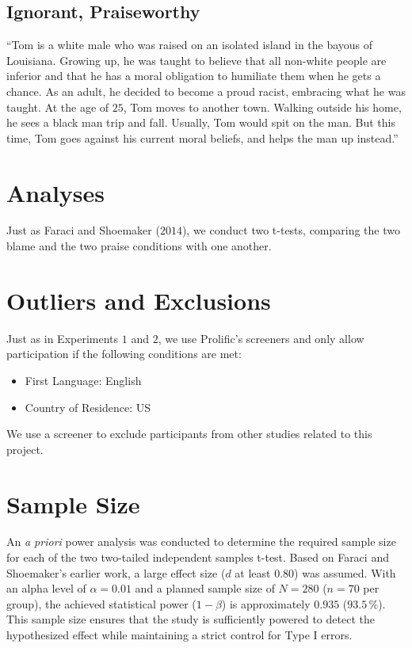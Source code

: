 \documentclass[scrarticle]{scrartcl}
\begin{document}
\subsection*{Ignorant, Praiseworthy}
\enquote{Tom is a white male who was raised on an isolated island in the bayous of Louisiana.
Growing up, he was taught to believe that all non-white people are inferior and that he has a moral obligation to humiliate them when he gets a chance.
As an adult, he decided to become a proud racist, embracing what he was taught.
At the age of $25$, Tom moves to another town.
Walking outside his home, he sees a black man trip and fall.
Usually, Tom would spit on the man.
But this time, Tom goes against his current moral beliefs, and helps the man up instead.}


\section{Analyses}
Just as Faraci and Shoemaker ($2014$), we conduct two t-tests, comparing the two blame and the two praise conditions with one another.


\section{Outliers and Exclusions}
Just as in Experiments $1$ and $2$, we use Prolific's screeners and only allow participation if the following conditions are met:

\begin{itemize}[noitemsep]
   \item[--] First Language: English
   \item[--] Country of Residence: US
\end{itemize}

\noindent We use a screener to exclude participants from other studies related to this project.


\section{Sample Size}
An \textit{a priori} power analysis was conducted to determine the required sample size for each of the two two-tailed independent samples t-test.
Based on Faraci and Shoemaker's earlier work, a large effect size ($d$ at least $0.80$) was assumed.
With an alpha level of $\alpha = 0.01$ and a planned sample size of $N = 280$ ($n = 70$ per group), the achieved statistical power ($1 - \beta$) is approximately $0.935$ ($93.5\,\%$).
This sample size ensures that the study is sufficiently powered to detect the hypothesized effect while maintaining a strict control for Type I errors.
\end{document}
